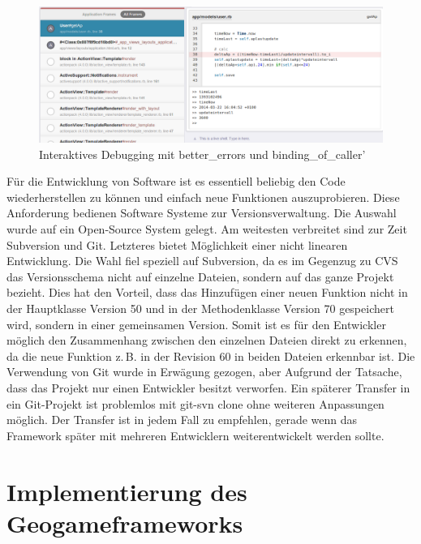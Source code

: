 \begin{figure}[H]
\begin{center}
\includegraphics[width=155mm]{images/ch5_img08_livebinding.png}
\caption{Interaktives Debugging mit \glqq better\_errors\grqq{} und \glqq binding\_of\_caller'}
\label{img:ch5_img08_livebinding}
\end{center}
\end{figure}

Für die Entwicklung von Software ist es essentiell beliebig den Code wiederherstellen zu können und einfach neue Funktionen auszuprobieren. Diese Anforderung bedienen Software Systeme zur Versionsverwaltung. 
Die Auswahl wurde auf ein Open-Source System gelegt. Am weitesten verbreitet sind zur Zeit Subversion und Git. Letzteres bietet Möglichkeit einer nicht linearen Entwicklung.\cite{Bird.2009}
Die Wahl fiel speziell auf Subversion, da es im Gegenzug zu CVS das Versionsschema nicht auf einzelne Dateien, sondern auf das ganze Projekt bezieht.
Dies hat den Vorteil, dass das Hinzufügen einer neuen Funktion nicht in der Hauptklasse Version 50 und in der Methodenklasse Version 70 gespeichert wird, sondern in einer gemeinsamen Version.
Somit ist es für den Entwickler möglich den Zusammenhang zwischen den einzelnen Dateien direkt zu erkennen, da die neue Funktion z.\,B. in der Revision 60 in beiden Dateien erkennbar ist.
Die Verwendung von Git wurde in Erwägung gezogen, aber Aufgrund der Tatsache, dass das Projekt nur einen Entwickler besitzt verworfen.  Ein späterer Transfer in ein Git-Projekt ist problemlos mit \glqq git-svn clone\grqq{} ohne weiteren Anpassungen möglich. Der Transfer ist in jedem Fall zu empfehlen, gerade wenn das Framework später mit mehreren Entwicklern weiterentwickelt werden sollte.

\section{Implementierung des Geogameframeworks}
\label{ch5:s:Implementierung}

